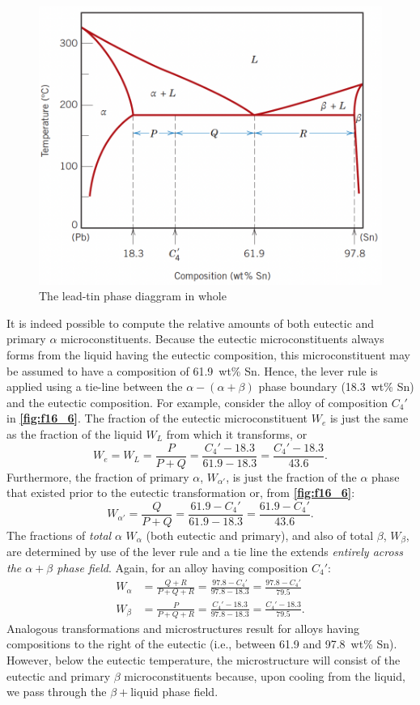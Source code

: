 \begin{figure} [ht]
  \centering
  \includegraphics[width=0.5\linewidth]{./figures/f16_6.png}
  \caption{The lead-tin phase diaggram in whole}
  \label{fig:f16_6}
\end{figure}
It is indeed possible to compute the relative amounts of both eutectic and primary $\alpha$ microconstituents. Because the eutectic microconstituents always forms from the liquid having the eutectic composition, this microconstituent may be assumed to have a composition of \qty{61,9}{wt}\% Sn. Hence, the lever rule is applied using a tie-line between the $\alpha-\left(\alpha + \beta  \right)$ phase boundary (\qty{18,3}{wt}\% Sn) and the eutectic composition. For example, consider the alloy of composition $C_4'$ in \textbf{\autoref{fig:f16_6}}. The fraction of the eutectic microconstituent $W_e$ is just the same as the fraction of the liquid $W_L$ from which it transforms, or
\[ 
  W_e = W_L = \frac{P}{P+Q} = \frac{C_4' - \num{18,3}}{\num{61,9} - \num{18,3}} = \frac{C_4' - \num{18,3} }{\num{43,6}}
.\]
Furthermore, the fraction of primary $\alpha$, $W_{\alpha'}$, is just the fraction of the $\alpha$ phase that existed prior to the eutectic transformation or, from \textbf{\autoref{fig:f16_6}}:
\[ 
W_{\alpha'} = \frac{Q}{P+Q} = \frac{\num{61,9} - C_4'}{\num{61,9} - \num{18,3} } = \frac{\num{61,9} - C_4'}{\num{43,6} }
.\]
The fractions of \textit{total} $\alpha$ $W_{\alpha}$ (both eutectic and primary), and also of total $\beta$, $W_{\beta}$, are determined by use of the lever rule and a tie line the extends \textit{entirely across the $\alpha + \beta$ phase field}. Again, for an alloy having composition $C_4'$:
\begin{align*}
  W_{\alpha} &= \frac{Q + R}{P + Q + R} = \frac{\num{97,8} - C_{4}'}{\num{97,8} - \num{18,3}} = \frac{\num{97,8} - C_4'}{\num{79,5}} \\
  W_{\beta} &= \frac{P}{P + Q + R} = \frac{C_4' - \num{18,3} }{\num{97,8} - \num{18,3}} = \frac{C_4' - \num{18,3} }{\num{79.5} }
.\end{align*}
Analogous transformations and microstructures result for alloys having compositions to the right of the eutectic (i.e., between \num{61,9} and \qty{97,8}{wt}\% Sn). However, below the eutectic temperature, the microstructure will consist of the eutectic and primary $\beta$ microconstituents because, upon cooling from the liquid, we pass through the $\beta+ \text{liquid}$ phase field. 


